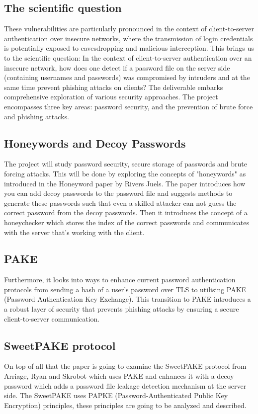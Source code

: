 \documentclass[conference,compsoc]{IEEEtran}
\begin{document}
\subsection{The scientific question} These vulnerabilities are particularly
pronounced in the context of client-to-server authentication over insecure
networks, where the transmission of login credentials is potentially exposed to
eavesdropping and malicious interception. This brings us to the scientific
question: In the context of client-to-server authentication over an insecure
network, how does one detect if a password file on the server side (containing
usernames and passwords) was compromised by intruders and at the same time
prevent phishing attacks on clients? The deliverable embarks comprehensive
exploration of various security approaches. The project encompasses three key
areas: password security, and the prevention of brute force and phishing
attacks.

\subsection{Honeywords and Decoy Passwords} The project will study password
security, secure storage of passwords and brute forcing attacks. This will be
done by exploring the concepts of "honeywords" as introduced in the Honeyword
paper \cite{juels2013honeywords} by Rivers Juels. The paper introduces how you can add decoy
passwords to the password file and suggests methods to generate these passwords
such that even a skilled attacker can not guess the correct password from the
decoy passwords. Then it introduces the concept of a honeychecker which stores
the index of the correct passwords and communicates with the server that's
working with the client.

\subsection{PAKE} Furthermore, it looks into ways to enhance current password
authentication protocols from sending a hash of a user's password over TLS to
utilising PAKE (Password Authentication Key Exchange). This transition to PAKE
introduces a a robust layer of security that prevents phishing attacks by
ensuring a secure client-to-server communication. 

\subsection{SweetPAKE protocol} On top of all that the paper is going to
examine the SweetPAKE protocol from Arriage, Ryan and Skrobot \cite{sweetpake}
which uses PAKE and enhances it with a decoy password which adds a password
file leakage detection mechanism at the server side. The SweetPAKE uses PAPKE\cite{papke}
(Password-Authenticated Public Key Encryption) principles, these principles are
going to be analyzed and described.
\end{document}
